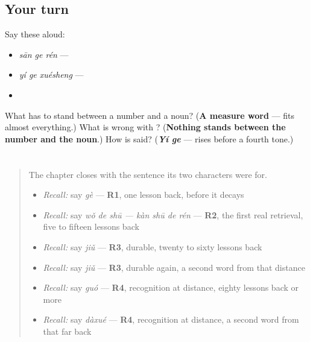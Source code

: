 \subsection*{Your turn}
Say these aloud:

\begin{itemize}
\raggedright
  \item \emph{sān ge rén} — 
  \item \emph{yí ge xuésheng} — 
  \item {}
\end{itemize}

\begin{tcolorbox}[breakable,colback=teal!4,colframe=teal!35!black,title={Before you move on}]
What has to stand between a number and a noun? (\textbf{A measure word} —  fits almost everything.) What is wrong with ? (\textbf{Nothing stands between the number and the noun}.) How is  said? (\emph{\textbf{Yí ge}} —  rises before a fourth tone.)
\end{tcolorbox}
\section[Practice]{}

\label{lesson:ZH-C24-practice}



\begin{quote}
The chapter closes with the sentence its two characters were for.

\begin{itemize}
\raggedright
  \item \emph{Recall:} say \emph{gè} — \textbf{R1}, one lesson back, before it decays
  \item \emph{Recall:} say \emph{wǒ de shū — kàn shū de rén} — \textbf{R2}, the first real retrieval, five to fifteen lessons back
  \item \emph{Recall:} say \emph{jiǔ} — \textbf{R3}, durable, twenty to sixty lessons back
  \item \emph{Recall:} say \emph{jiǔ} — \textbf{R3}, durable again, a second word from that distance
  \item \emph{Recall:} say \emph{guó} — \textbf{R4}, recognition at distance, eighty lessons back or more
  \item \emph{Recall:} say \emph{dàxué} — \textbf{R4}, recognition at distance, a second word from that far back
\end{itemize}
\end{quote}

